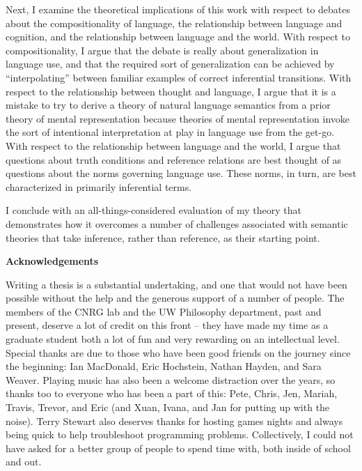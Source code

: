 Next, I examine the theoretical implications of this work with respect to debates about the compositionality of language, the relationship between language and cognition, and the relationship between language and the world. With respect to compositionality, I argue that the debate is really about generalization in language use, and that the required sort of generalization can be achieved by ``interpolating'' between familiar examples of correct inferential transitions. With respect to the relationship between thought and language, I argue that it is a mistake to try to derive a theory of natural language semantics from a prior theory of mental representation because theories of mental representation invoke the sort of intentional interpretation at play in language use from the get-go. With respect to the relationship between language and the world, I argue that questions about truth conditions and reference relations are best thought of as questions about the norms governing language use. These norms, in turn, are best characterized in primarily inferential terms. 

I conclude with an all-things-considered evaluation of my theory that demonstrates how it overcomes a number of challenges associated with semantic theories that take inference, rather than reference, as their starting point. 


\cleardoublepage


\begin{center}\textbf{Acknowledgements}\end{center}

Writing a thesis is a substantial undertaking, and one that would not have been possible without the help and the generous support of a number of people. The members of the CNRG lab and the UW Philosophy department, past and present, deserve a lot of credit on this front -- they have made my time as a graduate student both a lot of fun and very rewarding on an intellectual level. Special thanks are due to those who have been good friends on the journey since the beginning: Ian MacDonald, Eric Hochstein, Nathan Hayden, and Sara Weaver. Playing music has also been a welcome distraction over the years, so thanks too to everyone who has been a part of this: Pete, Chris, Jen, Mariah, Travis, Trevor, and Eric (and Xuan, Ivana, and Jan for putting up with the noise). Terry Stewart also deserves thanks for hosting games nights and always being quick to help troubleshoot programming problems. Collectively, I could not have asked for a better group of people to spend time with, both inside of school and out. 

